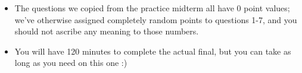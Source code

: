 \documentclass[addpoints, answers]{exam}
\begin{document}
\begin{center}
{{{\begin{itemize}
        \item The questions we copied from the practice midterm all
          have 0 point values; we've otherwise assigned completely
          random points to questions 1-7, and you should not ascribe
          any meaning to those numbers.

        \item You will have 120 minutes to complete the actual final,
          but you can take as long as you need on this one :)
        \end{itemize}
	}}}
\end{center}

\vspace{5mm}
\begin{center}
  \resizebox{0.8\textwidth}{!}{
    \combinedgradetable[h][questions]
  }
\end{center}
\vspace{5mm}



\vspace{5mm}
\end{document}
